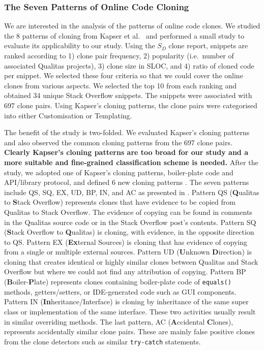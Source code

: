 \documentclass[sigconf,review, anonymous]{acmart}
\begin{document}
\subsubsection{The Seven Patterns of Online Code Cloning}

We are interested in the analysis of the patterns of online code clones. We studied the 8 patterns of cloning from Kapser et al.~\cite{Kapser2006,Kapser2008} and performed a small study to evaluate its applicability to our study. Using the $S_D$ clone report, snippets are ranked according to 1) clone pair frequency, 2) popularity (i.e.~number of associated Qualitas projects), 3) clone size in SLOC, and 4) ratio of cloned code per snippet. We selected these four criteria so that we could cover the online clones from various aspects. We selected the top 10 from each ranking and obtained 34 unique Stack Overflow snippets. The snippets were associated with 697 clone pairs. Using Kapser's cloning patterns, the clone pairs were categorised into either Customisation or Templating.

The benefit of the study is two-folded. We evaluated Kapser's cloning patterns and also observed the common cloning patterns from the 697 clone pairs. \textbf{Clearly Kapser's cloning patterns are too broad for our study and a more suitable and fine-grained classification scheme is needed.} After the study, we adopted one of Kapser's cloning patterns, boiler-plate code and API/library protocol, and defined 6 new cloning patterns . The seven patterns include QS, SQ, EX, UD, BP, IN, and AC as presented in . Pattern QS (\textbf{Q}ualitas to \textbf{S}tack Overflow) represents clones that have evidence to be copied from Qualitas to Stack Overflow. The evidence of copying can be found in comments in the Qualitas source code or in the Stack Overflow post's contents. Pattern SQ (\textbf{S}tack Overflow to \textbf{Q}ualitas) is cloning, with evidence, in the opposite direction to QS. Pattern EX (\textbf{Ex}ternal Sources) is cloning that has evidence of copying from a single or multiple external sources.  Pattern UD (\textbf{U}nknown \textbf{D}irection) is cloning that creates identical or highly similar clones between Qualitas and Stack Overflow but where we could not find any attribution of copying. %
Pattern BP (\textbf{B}oiler-\textbf{P}late) represents clones containing boiler-plate code of {\small\verb|equals()|} methods, getters/setters, or IDE-generated code such as GUI components. Pattern IN (\textbf{In}heritance/Interface) is cloning by inheritance of the same super class or implementation of the same interface. These two activities usually result in similar overriding methods. The last pattern, AC (\textbf{A}ccidental \textbf{C}lones), represents accidentally similar clone pairs. These are mainly false positive clones from the clone detectors such as similar {\small\texttt{try-catch}} statements. 
\end{document}
